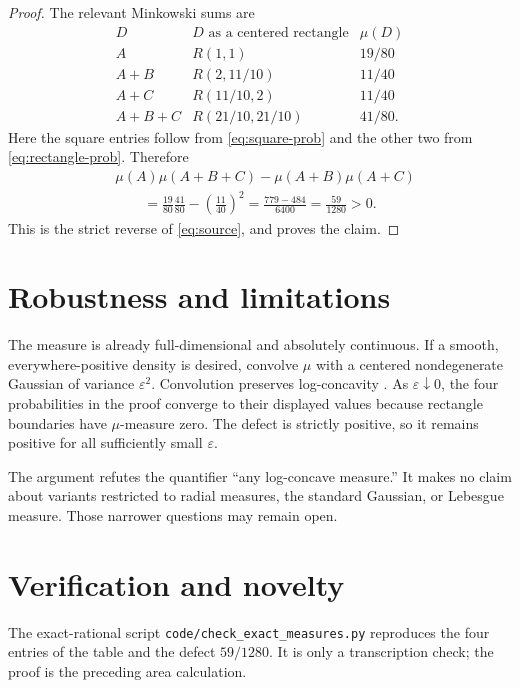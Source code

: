 \documentclass[11pt]{article}
\begin{document}
\begin{proof}
The relevant Minkowski sums are
\[
 \begin{array}{c|c|c}
 D & D\text{ as a centered rectangle} & \mu(D)\\ \hline
 A & R(1,1) & 19/80\\
 A+B & R(2,11/10) & 11/40\\
 A+C & R(11/10,2) & 11/40\\
 A+B+C & R(21/10,21/10) & 41/80.
 \end{array}
\]
Here the square entries follow from \eqref{eq:square-prob} and the other two
from \eqref{eq:rectangle-prob}.  Therefore
\[
 \begin{split}
 &\mu(A)\mu(A+B+C)-\mu(A+B)\mu(A+C)\\
 &\qquad=\frac{19}{80}\frac{41}{80}
          -\left(\frac{11}{40}\right)^2
 =\frac{779-484}{6400}
 =\frac{59}{1280}>0.
 \end{split}
\]
This is the strict reverse of \eqref{eq:source}, and proves the claim.
\end{proof}

\section{Robustness and limitations}

The measure is already full-dimensional and absolutely continuous.  If a
smooth, everywhere-positive density is desired, convolve $\mu$ with a
centered nondegenerate Gaussian of variance $\varepsilon^2$.  Convolution
preserves log-concavity \cite{Gardner}.  As $\varepsilon\downarrow0$, the four probabilities
in the proof converge to their displayed values because rectangle boundaries
have $\mu$-measure zero.  The defect is strictly positive, so it remains
positive for all sufficiently small $\varepsilon$.

The argument refutes the quantifier ``any log-concave measure.''  It makes no
claim about variants restricted to radial measures, the standard Gaussian,
or Lebesgue measure.  Those narrower questions may remain open.

\section{Verification and novelty}

The exact-rational script \texttt{code/check\_exact\_measures.py} reproduces
the four entries of the table and the defect $59/1280$.  It is only a
transcription check; the proof is the preceding area calculation.
\end{document}
